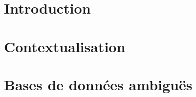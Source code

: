 
\section{Introduction}

\begin{frame}{}
    
\end{frame}

\section{Contextualisation}

\begin{frame}{}
    
\end{frame}

\begin{frame}{}
    
\end{frame}

\begin{frame}{}
    
\end{frame}

\section{Bases de données ambiguës}

\begin{frame}{}
    
\end{frame}

\begin{frame}{}
    
\end{frame}
